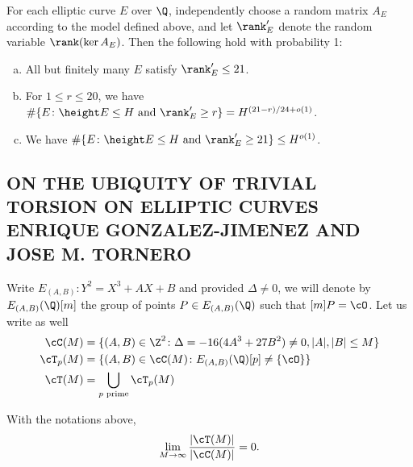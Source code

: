 \begin{thm}[Thm 1]
For each elliptic curve $E$ over $\Q$, independently choose a random matrix $A_E$ according to the model defined above, and let $\rank_E'$ denote the random variable $\rank(\ker A_E)$. Then the following hold with probability 1:
	\begin{enumerate}[(a)]
	\item All but finitely many $E$ satisfy $\rank_E' \leq 21$.
	\item For $1 \leq r \leq 20$, we have $\#\{ E \colon \height E \leq H \text{ and } \rank_E' \geq r \} = H^{(21-r)/24 + o(1)}$.
	\item We have $\#\{ E \colon \height E \leq H \text{ and } \rank_E' \geq 21 \} \leq H^{o(1)}$. 
	\end{enumerate}
\end{thm}























\subsection{ ON THE UBIQUITY OF TRIVIAL TORSION ON ELLIPTIC CURVES ENRIQUE GONZALEZ-JIMENEZ AND JOSE M. TORNERO}


Write $E_{(A,B)}: Y^2= X^3 + AX + B$ and provided $\Delta \neq 0$, we will denote by $E_{(A,B)}(\Q)[m]$ the group of points $P \in E_{(A,B)}(\Q)$ such that $[m]P= \cO$. Let us write as well
	\[
	\begin{aligned}
	\cC(M)&= \{ (A,B) \in \Z^2 \colon \Delta= -16(4A^3 + 27B^2) \neq 0, |A|, |B| \leq M \} \\
	\cT_p(M)&= \{ (A,B) \in \cC(M) \colon E_{(A,B)}(\Q)[p] \neq \{ \cO \} \} \\
	\cT(M)&= \bigcup_{p \text{ prime}} \cT_p(M)
	\end{aligned}
	\]


\begin{thm}[Thm 1]
With the notations above,
	\[
	\lim_{M \to \infty} \dfrac{|\cT(M)|}{|\cC(M)|}= 0.
	\]
\end{thm}


